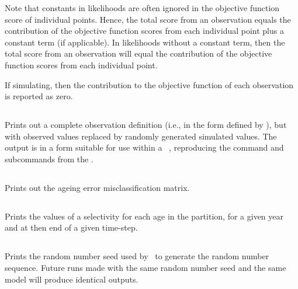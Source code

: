 Note that constants in likelihoods are often ignored in the objective function score of individual points. Hence, the total score from an observation equals the contribution of the objective function scores from each individual point plus a constant term (if applicable). In likelihoods without a constant term, then the total score from an observation will equal the contribution of the objective function scores from each individual point.

If simulating, then the contribution to the objective function of each observation is reported as zero. 

\subsection{}

Prints out a complete observation definition (i.e., in the form defined by ), but with observed values replaced by randomly generated simulated values. The output is in a form  suitable for use within a \CNAME\ \config, reproducing the command and subcommands from the \config.

\subsection{}\label{sec:ageingerrorreport}

Prints out the ageing error misclassification matrix.

\subsection{}

Prints the values of a selectivity for each age in the partition, for a given year and at then end of a given time-step.

\subsection{}

Prints the random number seed used by \CNAME\ to generate the random number sequence. Future runs made with the same random number seed and the same model will produce identical outputs.

